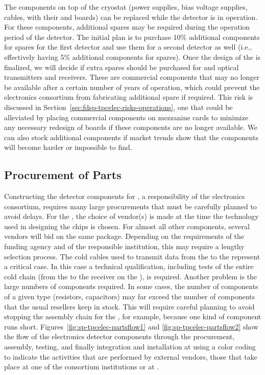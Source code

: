 The components on top of the cryostat (power supplies, bias
voltage supplies, cables,  with their 
and  boards) can be replaced while the
detector is in operation. For these components, additional spares may be required
during the \dunelifetime operation period of the  detector.
The initial plan is to purchase 10\% additional components for spares for the first
 detector and use them for a second detector as well
(i.e., effectively having 5\% additional components for spares). Once the design of
the  is finalized, we will decide if 
extra spares should be purchased for  and optical
transmitters and receivers. These are commercial components 
that may no longer be available after a certain number of 
years of operation, which could prevent the  electronics consortium from
fabricating additional spare  if required. This
risk is discussed in Section~\ref{sec:fdsp-tpcelec-risks-operations}, one that
could be alleviated by placing commercial components
on mezzanine cards to minimize any necessary redesign of
boards if these components are no longer available.
We can also stock additional components
if market trends show that the components will  
become harder or impossible to find.

\subsection{Procurement of Parts}
\label{sec:fdsp-tpcelec-production-procurement}

Constructing the detector components for , a responsibility 
of the  electronics consortium, requires many large procurements that 
must be carefully planned to avoid delays. For the , the 
choice of vendor(s) is made at the time the technology used in designing 
the chips is chosen. For almost all other components, several vendors 
will bid on the same package. Depending on the requirements of the funding
agency and of the responsible institution, this may require a lengthy
selection process. The cold cables used to transmit data from the
 to the  represent a critical case. In this case
a technical qualification, including tests of the entire cold chain (from the 
to the receiver on the ), is required. Another problem is the 
large numbers of components required. In some cases, the number of components 
of a given type (resistors, capacitors) may far exceed the number of components
that the usual resellers keep in stock. This will 
require careful planning to avoid stopping the assembly chain for
the , for example, because 
one kind of component runs short. Figures~\ref{fig:sp-tpcelec-partsflow1}
and \ref{fig:sp-tpcelec-partsflow2} show the flow of the 
electronics detector components through the procurement, assembly,
 testing, and finally integration and installation at 
 using a color coding to indicate the activities that
are performed by external vendors, those that take place at one of
the consortium institutions or at .

